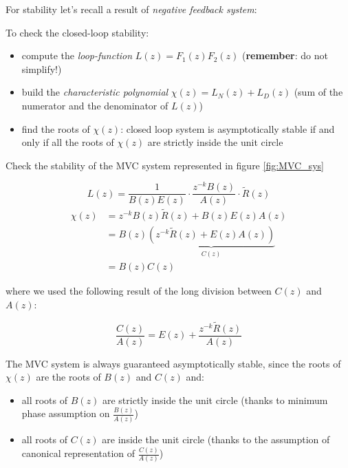 \begin{recall}
    For stability let's recall a result of \emph{negative feedback system}:
    \begin{figure}[H]
        \centering
    \end{figure}

    To check the closed-loop stability:
    \begin{itemize}
        \item compute the \emph{loop-function} $L(z) = F_1(z) F_2(z)$ (\textbf{remember}: do not simplify!)
        \item build the \emph{characteristic polynomial} $\chi(z) = L_N(z) + L_D(z)$ (sum of the numerator and the denominator of $L(z)$)
        \item find the roots of $\chi(z)$: closed loop system is asymptotically stable if and only if all the roots of $\chi(z)$ are strictly inside the unit circle
    \end{itemize}
\end{recall}

Check the stability of the MVC system represented in figure \ref{fig:MVC_sys}

\[
    L(z) = \frac{1}{B(z)E(z)}\cdot \frac{z^{-k}B(z)}{A(z)}\cdot\tilde{R}(z)
\]
\begin{align*}
    \chi(z) &= z^{-k}B(z)\tilde{R}(z) + B(z)E(z)A(z) \\
    &= B(z) \underbrace{\left( z^{-k}\tilde{R}(z)+E(z)A(z) \right)}_{C(z)}  \\
    &= B(z)C(z)
\end{align*}

where we used the following result of the long division between $C(z)$ and $A(z)$:

\[ \frac{C(z)}{A(z)} = E(z) + \frac{z^{-k} \tilde{R}(z)}{A(z)} \]

The MVC system is always guaranteed asymptotically stable, since the roots of $\chi(z)$ are the roots of $B(z)$ and $C(z)$ and:
\begin{itemize}
    \item all roots of $B(z)$ are strictly inside the unit circle (thanks to minimum phase assumption on $\frac{B(z)}{A(z)}$)
    \item all roots of $C(z)$ are inside the unit circle (thanks to the assumption of canonical representation of $\frac{C(z)}{A(z)}$)
\end{itemize}

